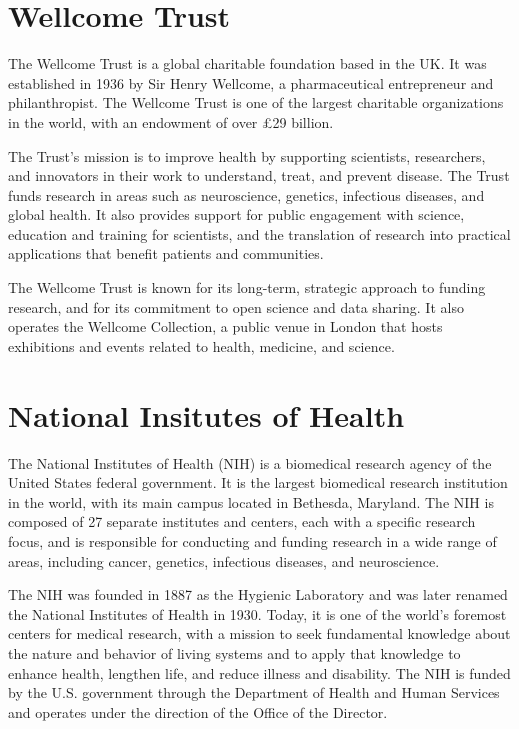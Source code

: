 \documentclass[
]{book}
\begin{document}
\hypertarget{wellcome}{%
\section{Wellcome Trust}\label{wellcome}}

The Wellcome Trust is a global charitable foundation based in the UK. It was established in 1936 by Sir Henry Wellcome, a pharmaceutical entrepreneur and philanthropist. The Wellcome Trust is one of the largest charitable organizations in the world, with an endowment of over £29 billion.

The Trust's mission is to improve health by supporting scientists, researchers, and innovators in their work to understand, treat, and prevent disease. The Trust funds research in areas such as neuroscience, genetics, infectious diseases, and global health. It also provides support for public engagement with science, education and training for scientists, and the translation of research into practical applications that benefit patients and communities.

The Wellcome Trust is known for its long-term, strategic approach to funding research, and for its commitment to open science and data sharing. It also operates the Wellcome Collection, a public venue in London that hosts exhibitions and events related to health, medicine, and science.

\hypertarget{nih}{%
\section{National Insitutes of Health}\label{nih}}

The National Institutes of Health (NIH) is a biomedical research agency of the United States federal government. It is the largest biomedical research institution in the world, with its main campus located in Bethesda, Maryland. The NIH is composed of 27 separate institutes and centers, each with a specific research focus, and is responsible for conducting and funding research in a wide range of areas, including cancer, genetics, infectious diseases, and neuroscience.

The NIH was founded in 1887 as the Hygienic Laboratory and was later renamed the National Institutes of Health in 1930. Today, it is one of the world's foremost centers for medical research, with a mission to seek fundamental knowledge about the nature and behavior of living systems and to apply that knowledge to enhance health, lengthen life, and reduce illness and disability. The NIH is funded by the U.S. government through the Department of Health and Human Services and operates under the direction of the Office of the Director.
\end{document}
